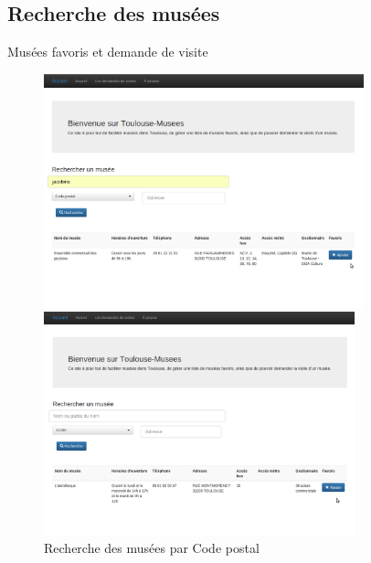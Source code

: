 \AntoineSpeak
\subsection{Recherche des mus\'ees}
\begin{frame}{Musées favoris et demande de visite}
	\begin{figure}
		\centering
		
		 { 
		\includegraphics[width=9.25cm]{screens/search_by_name.png}
		\caption{Recherche des musées par nom}
		}

		\only<3> { 
		\includegraphics[width=9cm]{screens/search_by_postalcode.png}
		\caption{Recherche des musées par Code postal}
		}
		

\end{figure}
\end{frame}
